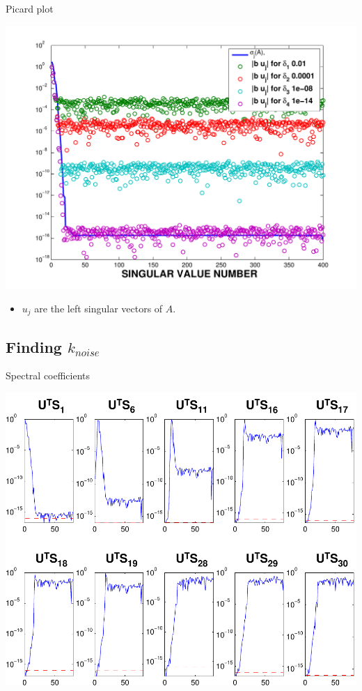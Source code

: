 \documentclass{beamer}
\begin{document}
\begin{frame}{Picard plot}
  \begin{center}
    \includegraphics[width=.55\linewidth]{figures/picard}
  \end{center}
  \begin{itemize}
    \item $u_{j}$ are the left singular vectors of $A$.
  \end{itemize}
\end{frame}

\subsection{Finding $k_{noise}$}
\begin{frame}{Spectral coefficients}
  \begin{center}
    \includegraphics[width=0.55\linewidth]{figures/run1/spec_sk}
  \end{center}
\end{frame}
\end{document}
